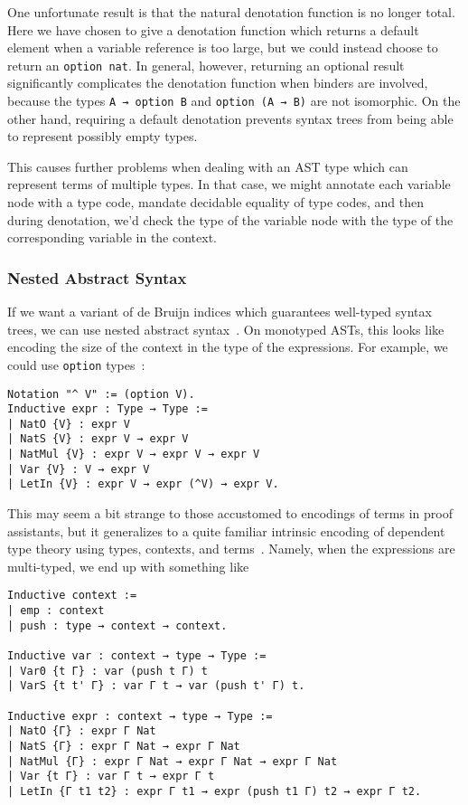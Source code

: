One unfortunate result is that the natural denotation function is no longer total.
Here we have chosen to give a denotation function which returns a default element when a variable reference is too large, but we could instead choose to return an \texttt{option nat}.
In general, however, returning an optional result significantly complicates the denotation function when binders are involved, because the types \texttt{A → option B} and \texttt{option (A → B)} are not isomorphic.
On the other hand, requiring a default denotation prevents syntax trees from being able to represent possibly empty types.

This causes further problems when dealing with an AST type which can represent terms of multiple types.
In that case, we might annotate each variable node with a type code, mandate decidable equality of type codes, and then during denotation, we'd check the type of the variable node with the type of the corresponding variable in the context.

\subsubsection{Nested Abstract Syntax} \label{sec:binders:nested-abstract-syntax}
If we want a variant of de Bruijn indices which guarantees well-typed syntax trees, we can use nested abstract syntax~\cite{Nested2012Hirschowitz,deBruijn1999Bird}.
On monotyped ASTs, this looks like encoding the size of the context in the type of the expressions.
For example, we could use \texttt{option} types~\cite{Nested2012Hirschowitz}:
\begin{verbatim}
Notation "^ V" := (option V).
Inductive expr : Type → Type :=
| NatO {V} : expr V
| NatS {V} : expr V → expr V
| NatMul {V} : expr V → expr V → expr V
| Var {V} : V → expr V
| LetIn {V} : expr V → expr (^V) → expr V.
\end{verbatim}

This may seem a bit strange to those accustomed to encodings of terms in proof assistants, but it generalizes to a quite familiar intrinsic encoding of dependent type theory using types, contexts, and terms~\cite{Strongly2012Benton}.
Namely, when the expressions are multi-typed, we end up with something like
\begin{verbatim}
Inductive context :=
| emp : context
| push : type → context → context.

Inductive var : context → type → Type :=
| Var0 {t Γ} : var (push t Γ) t
| VarS {t t' Γ} : var Γ t → var (push t' Γ) t.

Inductive expr : context → type → Type :=
| NatO {Γ} : expr Γ Nat
| NatS {Γ} : expr Γ Nat → expr Γ Nat
| NatMul {Γ} : expr Γ Nat → expr Γ Nat → expr Γ Nat
| Var {t Γ} : var Γ t → expr Γ t
| LetIn {Γ t1 t2} : expr Γ t1 → expr (push t1 Γ) t2 → expr Γ t2.
\end{verbatim}

